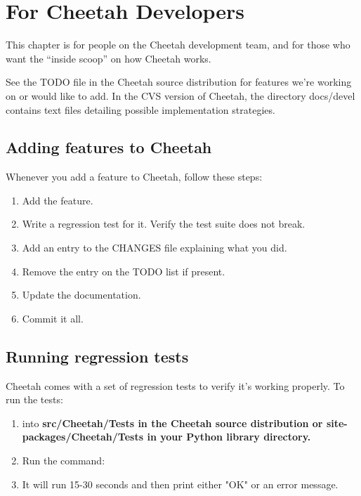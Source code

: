 \section{For Cheetah Developers}
\label{developer}

This chapter is for people on the Cheetah development team, and for those who
want the ``inside scoop'' on how Cheetah works.

See the TODO file in the Cheetah source distribution for features we're
working on or would like to add.  In the CVS version of Cheetah, the directory
docs/devel contains text files detailing possible implementation strategies.

\subsection{Adding features to Cheetah}

Whenever you add a feature to Cheetah, follow these steps:

\begin{enumerate}

\item  Add the feature.

\item  Write a regression test for it.  Verify the test suite does not break.

\item  Add an entry to the CHANGES file explaining what you did.

\item  Remove the entry on the TODO list if present.

\item  Update the documentation.

\item  Commit it all.

\end{enumerate}


\subsection{Running regression tests}

Cheetah comes with a set of regression tests to verify it's working properly.
To run the tests:

\begin{enumerate}

\item  {} into \bf{src/Cheetah/Tests} in the Cheetah source distribution 
     or \bf{site-packages/Cheetah/Tests} in your Python library directory.
     
\item  Run the command:  

\item  It will run 15-30 seconds and then print either "OK" or an error message.

\end{enumerate}

